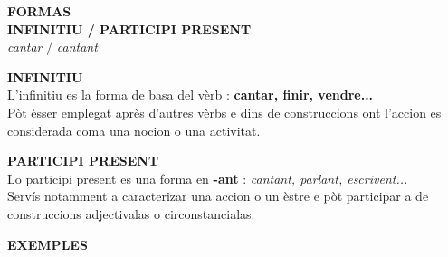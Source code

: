 \documentclass[a4paper,11pt]{article}
\begin{document}
\par\vspace{2.5mm}\noindent\begin{minipage}{.94\textwidth}
\begin{neutralbox}\textbf{\color{NeutralDark}FORMAS}\\[1mm]\centering
{\Large\textbf{INFINITIU \quad / \quad PARTICIPI PRESENT}}\\[1mm]
\small \textit{cantar} \quad / \quad \textit{cantant}
\end{neutralbox}
\vspace{2.5mm}\begin{center}\end{center}
\vspace{1.5mm}
\begin{neutralbox}\textbf{\color{NeutralDark}INFINITIU}\\[1mm]
L'infinitiu es la forma de basa del vèrb : \textbf{cantar, finir, vendre...}\\
Pòt èsser emplegat après d'autres vèrbs e dins de construccions ont l'accion es considerada coma una nocion o una activitat.
\end{neutralbox}
\vspace{2mm}
\begin{neutralbox}\textbf{\color{NeutralDark}PARTICIPI PRESENT}\\[1mm]
Lo participi present es una forma en \textbf{-ant} : \textit{cantant, parlant, escrivent...}\\
Servís notamment a caracterizar una accion o un èstre e pòt participar a de construccions adjectivalas o circonstancialas.
\end{neutralbox}
\vspace{2mm}
\begin{minipage}{.485\textwidth}\begin{neutralbox}[height=3.15cm]
\textbf{\color{NeutralDark}EXEMPLES}\\[1mm]

\end{neutralbox}
\end{minipage}
\end{minipage}
\end{document}
